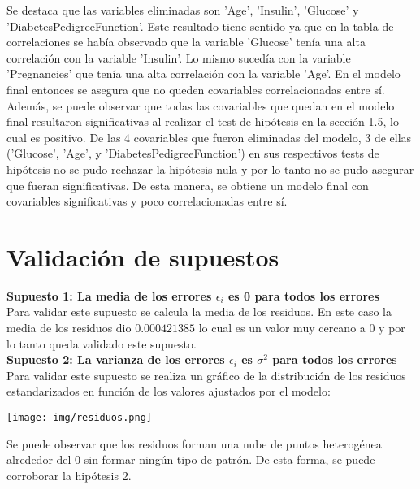 \documentclass{article}
\begin{document}
\noindent
Se destaca que las variables eliminadas son 'Age', 'Insulin', 'Glucose' y 'DiabetesPedigreeFunction'. Este resultado tiene sentido ya que en la tabla de correlaciones se había observado que la variable 'Glucose' tenía una alta correlación con la variable 'Insulin'. Lo mismo sucedía con la variable 'Pregnancies' que tenía una alta correlación con la variable 'Age'. En el modelo final entonces se asegura que no queden covariables correlacionadas entre sí. Además, se puede observar que todas las covariables que quedan en el modelo final resultaron significativas al realizar el test de hipótesis en la sección 1.5, lo cual es positivo. De las 4 covariables que fueron eliminadas del modelo, 3 de ellas ('Glucose', 'Age', y 'DiabetesPedigreeFunction') en sus respectivos tests de hipótesis no se pudo rechazar la hipótesis nula y por lo tanto no se pudo asegurar que fueran significativas. De esta manera, se obtiene un modelo final con covariables significativas y poco correlacionadas entre sí.





\section{Validación de supuestos}
\textbf{Supuesto 1: La media de los errores \(\epsilon_i\) es 0 para todos los errores}\\

\noindent
Para validar este supuesto se calcula la media de los residuos. En este caso la media de los residuos dio \(0.000421385\) lo cual es un valor muy cercano a 0 y por lo tanto queda validado este supuesto.\\


\noindent
\textbf{Supuesto 2: La varianza de los errores \(\epsilon_i\) es \(\sigma^2\) para todos los errores}\\

\noindent
Para validar este supuesto se realiza un gráfico de la distribución de los residuos estandarizados en función de los valores ajustados por el modelo:\\

\begin{center}
    \texttt{[image: img/residuos.png]}
\end{center}

\noindent
Se puede observar que los residuos forman una nube de puntos heterogénea alrededor del 0 sin formar ningún tipo de patrón. De esta forma, se puede corroborar la hipótesis 2.\\
\end{document}
